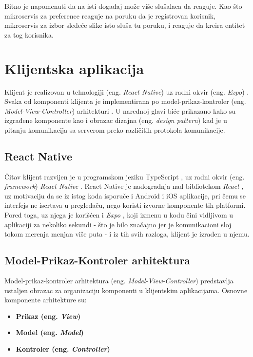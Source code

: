 \documentclass[12pt,oneside]{memoir}
\begin{document}
Bitno je napomenuti da na isti događaj može više slušalaca da reaguje. Kao što mikroservis za preference reaguje na
poruku da je registrovan korisnik, mikroservis za izbor sledeće slike isto sluša tu poruku, i reaguje da kreira 
entitet za tog korisnika. 


\label{ch:server}
\chapter{Klijentska aplikacija}
Klijent je realizovan u tehnologiji (eng. \textit{React Native}) \cite{reactnative} uz radni okvir (eng. \textit{Expo}) \cite{expo}. Svaka od komponenti klijenta 
je implementirana po model-prikaz-kontroler (eng. \textit{Model-View-Controller}) arhitekturi \cite{fowler-mvc}. U narednoj glavi biće prikazano kako su izgrađene komponente kao i 
obrazac dizajna (eng. \textit{design pattern}) kad je u pitanju komunikacija sa serverom preko 
različitih protokola komunikacije.

\section{React Native}

Čitav klijent razvijen je u programskom jeziku TypeScript \cite{typescript}, uz radni okvir
(eng. \textit{framework}) \textit{React Native} \cite{reactnative}. React Native
je nadogradnja nad bibliotekom \textit{React} \cite{react}, uz motivaciju da se iz istog
koda isporuče i Android i iOS aplikacije, pri čemu se interfejs ne iscrtava
u pregledaču, nego koristi izvorne komponente tih platformi. Pored toga,
uz njega je korišćen i \textit{Expo} \cite{expo}, koji izmenu u kodu čini
vidljivom u aplikaciji za nekoliko sekundi - što je bilo značajno jer je
komunikacioni sloj tokom merenja menjan više puta - i iz tih svih razloga,
klijent je izrađen u njemu.

\section{Model-Prikaz-Kontroler arhitektura}

Model-prikaz-kontroler arhitektura (eng. \textit{Model-View-Controller}) \cite{fowler-mvc, fowler2002} predstavlja ustaljen obrazac za organizaciju komponenti u klijentskim aplikacijama.
Osnovne komponente arhitekture su:
\begin{itemize}
\item \textbf{Prikaz (eng. \textit{View})}
\item \textbf{Model (eng. \textit{Model})} 
\item \textbf{Kontroler (eng. \textit{Controller})} 
\end{itemize}
\end{document}
